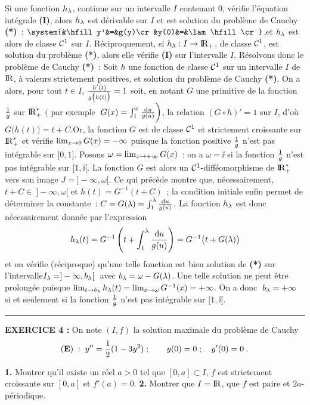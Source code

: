 \documentclass{article}
\begin{document}
Si une fonction $h_{\lambda}$, continue sur un intervalle $I$ contenant 0, v\'erifie l'\'equation int\'egrale {\bf (I)}, alors $h_{\lambda}$ est d\'erivable sur $I$ et est solution du probl\`eme de Cauchy {\bf (*)}~: $\system{&\hfill y'&=&g(y)\cr &y(0)&=&\lam\hfill\cr}$,\break et $h_{\lambda}$ est alors de classe ${\cal C}^1$ sur $I$.\msk
R\'eciproquement, si $h_{\lambda}:I\rightarrow{\rm I\kern-0.6mm R}_+$, de classe ${\cal C}^1$, est solution du probl\`eme  {\bf (*)}, alors elle v\'erifie {\bf (I)} sur l'intervalle $I$.\msk
R\'esolvons donc le probl\`eme de Cauchy {\bf (*)}~:\ssk
Soit $h$ une fonction de classe ${\cal C}^1$ sur un intervalle $I$ de ${\rm I\kern-0.6mm R}$, \`a valeurs strictement positives, et solution du probl\`eme de Cauchy {\bf (*)}. On a alors, pour tout $t\in I$, ${h'(t)\over g\big(h(t)\big)}=1$ soit, en notant $G$ une primitive de la fonction ${1\over g}$ sur ${\rm I\kern-0.6mm R}_+^*$ $\bigg($ par exemple $\;G(x)=\int_1^x{{\rm d}u\over g(u)}\bigg)$, la relation $(G\circ h)'=1$ sur $I$, d'o\`u $G\big(h(t)\big)=t+C$.\ssk\sect Or, la fonction $G$ est de classe ${\cal C}^1$ et strictement croissante sur ${\rm I\kern-0.6mm R}_+^*$ et v\'erifie $\lim_{x\rightarrow0}G(x)=-\infty$ puisque la fonction positive ${1\over g}$ n'est pas int\'egrable sur $]0,1]$. Posons $\omega=\lim_{x\rightarrow+\infty}G(x)$~: on a $\omega=\ii$ si la fonction ${1\over g}$ n'est pas int\'egrable sur $[1,\ii[$. La fonction $G$ est alors un ${\cal C}^1$-diff\'eomorphisme de ${\rm I\kern-0.6mm R}_+^*$ vers son image $J=]-\infty,\omega[$.\ssk\sect
Ce qui pr\'ec\`ede montre que, n\'ecessairement, $t+C\in\>]-\infty,\omega[$ et $h(t)=G^{-1}(t+C)$~; la condition initiale enfin permet de d\'eterminer la constante~: $C=G(\lambda)=\int_1^{\lambda}{{\rm d}u\over g(u)}$. La fonction $h_{\lambda}$ est donc n\'ecessairement donn\'ee par l'expression\vv
$$h_{\lambda}(t)=G^{-1}\left( t+\int_1^{\lambda}{{\rm d}u\over g(u)}\right)=G^{-1}\big(t+G(\lambda)\big)$$
et on v\'erifie (r\'eciproque) qu'une telle fonction est bien solution de {\bf (*)} sur l'intervalle\break $I_{\lambda}=]-\infty,b_{\lambda}[\>$ avec $b_{\lambda}=\omega-G(\lambda)$. Une telle solution ne peut \^etre prolong\'ee puisque $\lim_{t\rightarrow b_{\lambda}}h_{\lambda}(t)=\lim_{x\rightarrow\omega}G^{-1}(x)=+\infty$.\msk
On a donc $\;b_{\lambda}=+\infty$ si et seulement si la fonction ${1\over g}$ n'est pas int\'egrable sur $[1,\ii[$.

\bsk
\hrule
\bsk

{\bf EXERCICE 4 :}\msk
On note $(I,f)$ la solution maximale du probl\`eme de Cauchy\vv
$${\bf (E)}\;:\;y''={1\over2}(1-3y^2)\;;\qquad y(0)=0\;;\quad y'(0)=0\;.$$\par
{\bf 1.} Montrer qu'il existe un r\'eel $a>0$ tel que $[0,a]\subset I$, $f$ est strictement croissante sur $[0,a]$ et $f'(a)=0$.\msk
{\bf 2.} Montrer que $I={\rm I\kern-0.6mm R}$, que $f$ est paire et $2a$-p\'eriodique.
\end{document}
